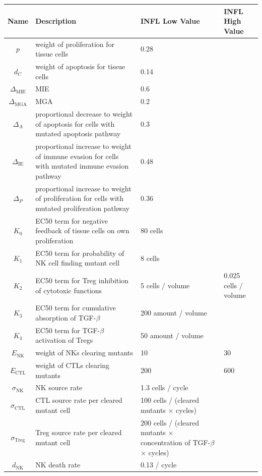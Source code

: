 \documentclass[11pt, a4paper, preprint]{article}
\begin{document}
\begin{longtable}{| c | p{5cm} | m{3cm} | m{3cm} |} 
 \hline
 Name & Description & INFL Low Value & INFL High Value  \\ [0.5ex] 
 \hline\hline
  $p$ & weight of proliferation for tissue cells & 0.28 & \\ 
 \hline
 $d_C$  & weight of apoptosis for tissue cells & 0.14 & \\
 \hline
$\Delta_\text{MIE}$ & MIE & 0.6 & \\
 \hline
 $\Delta_\text{MGA}$ & MGA  & 0.2 &  \\
 \hline
  $\Delta_A$ & proportional decrease to weight of apoptosis for cells with mutated apoptosis pathway & 0.3 &  \\
  \hline
  $\Delta_\text{IE}$ & proportional increase to weight of immune evasion for cells with mutated immune evasion pathway & 0.48 &  \\
  \hline
  $\Delta_P$ & proportional increase to weight of proliferation for cells with mutated proliferation pathway & 0.36 &  \\
  \hline
 $K_0$ & EC50 term for negative feedback of tissue cells on own proliferation & 80 cells& \\
 \hline
 $K_1$ & EC50 term for probability of NK cell finding mutant cell & 8 cells& \\
 \hline
  $K_2$ & EC50 term for Treg inhibition of cytotoxic functions & 5 cells / volume & 0.025 cells / volume \\
  \hline
  $K_3$ & EC50 term for cumulative absorption of TGF-$\beta$ & 200 amount / volume & \\
  \hline
  $K_4$ & EC50 term for TGF-$\beta$ activation of Tregs & 50 amount / volume & \\
  \hline
 $E_\text{NK}$ & weight of NKs clearing mutants & 10 & 30  \\
  \hline
  $E_\text{CTL}$ & weight of CTLs clearing mutants & 200 & 600 \\
  \hline
  $\sigma_\text{NK}$ & NK source rate & 1.3 cells / cycle &  \\ 
  \hline
  $\sigma_\text{CTL}$ & CTL source rate per cleared mutant cell & 100 cells / (cleared mutants $\times$ cycles)& \\ 
  \hline
  $\sigma_\text{Treg}$ & Treg source rate per cleared mutant cell & 200 cells / (cleared mutants $\times$ concentration of TGF-$\beta$ $\times$ cycles)& \\ 
  \hline
  $d_\text{NK}$ & NK death rate & 0.13 / cycle &  \\ 

\end{longtable}
\end{document}
